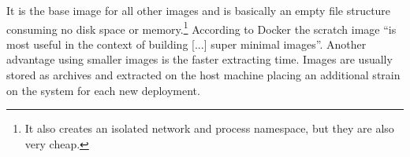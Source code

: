 It is the base image for all other images and is basically an empty file structure consuming no disk space or memory.\footnote{It also creates an isolated network and process namespace, but they are also very cheap.} According to Docker the scratch image ``is most useful in the context of building [...] super minimal images''\cite{scratchImageDockerD65:online}. Another advantage using smaller images is the faster extracting time. Images are usually stored as archives and extracted on the host machine placing an additional strain on the system for each new deployment.\\[5mm]
